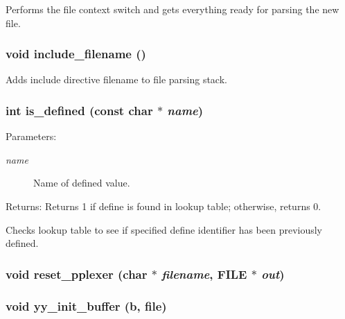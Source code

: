Performs the file context switch and gets everything ready for parsing the new file. 
\subsubsection{\setlength{\rightskip}{0pt plus 5cm}void include\_\-filename ()\hspace{0.3cm}{\tt  [static]}}\label{pplexer_8c_a136}


Adds include directive filename to file parsing stack. 
\subsubsection{\setlength{\rightskip}{0pt plus 5cm}int is\_\-defined (const char $\ast$ {\em name})\hspace{0.3cm}{\tt  [static]}}\label{pplexer_8c_a135}


\begin{Desc}
\item[Parameters:]
\begin{description}
\item[{\em name}]Name of defined value.\end{description}
\end{Desc}
\begin{Desc}
\item[Returns:]Returns 1 if define is found in lookup table; otherwise, returns 0.\end{Desc}
Checks lookup table to see if specified define identifier has been previously defined. 
\subsubsection{\setlength{\rightskip}{0pt plus 5cm}void reset\_\-pplexer (char $\ast$ {\em filename}, FILE $\ast$ {\em out})}\label{pplexer_8c_a144}


\subsubsection{\setlength{\rightskip}{0pt plus 5cm}void yy\_\-init\_\-buffer (b, {\bf file})}\label{pplexer_8c_a141}


